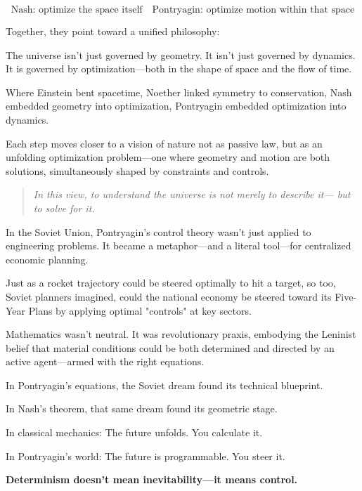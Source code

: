 \begin{tcolorbox}[colback=blue!5!white, colframe=blue!50!black, title={Two Levels of Optimization}]
\[
\boxed{
\text{Nash: optimize the space itself}
\quad
\text{Pontryagin: optimize motion within that space}
}
\]
\end{tcolorbox}

Together, they point toward a unified philosophy:

The universe isn’t just governed by geometry.  
It isn’t just governed by dynamics.  
It is governed by optimization—both in the shape of space and the flow of time.

\medskip

Where Einstein bent spacetime,  
Noether linked symmetry to conservation,  
Nash embedded geometry into optimization,  
Pontryagin embedded optimization into dynamics.

Each step moves closer to a vision of nature not as passive law,  
but as an unfolding optimization problem—one where geometry and motion  
are both solutions, simultaneously shaped by constraints and controls.

\begin{quote}
\textit{In this view, to understand the universe is not merely to describe it—  
but to solve for it.}
\end{quote}

\begin{tcolorbox}[colback=gray!5!white, colframe=gray!50!black, title={Historical Sidebar: When Optimization Became Ideology}]
In the Soviet Union, Pontryagin’s control theory wasn’t just applied to engineering problems.  
It became a metaphor—and a literal tool—for centralized economic planning.

Just as a rocket trajectory could be steered optimally to hit a target,  
so too, Soviet planners imagined, could the national economy be steered toward its  
Five-Year Plans by applying optimal "controls" at key sectors.

Mathematics wasn’t neutral.  
It was revolutionary praxis,  
embodying the Leninist belief that material conditions could be both determined  
and directed by an active agent—armed with the right equations.

In Pontryagin’s equations, the Soviet dream found its technical blueprint.

In Nash’s theorem, that same dream found its geometric stage.
\end{tcolorbox}


\begin{tcolorbox}[colback=blue!5!white, colframe=blue!50!black, title={Pontryagin’s Maximum Principle: Leninism in Mathematical Form}]
In classical mechanics:  
\quad The future unfolds. You calculate it.

In Pontryagin’s world:  
\quad The future is programmable. You steer it.

\textbf{Determinism doesn’t mean inevitability—it means control.}
\end{tcolorbox}

